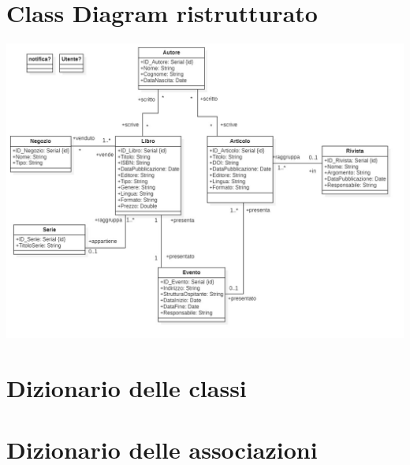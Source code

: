     \section{Class Diagram ristrutturato}
    \includegraphics[scale=0.25]{Immagini/UMLris_v1_0.png}
        
    \section{Dizionario delle classi}
        
    \section{Dizionario delle associazioni}